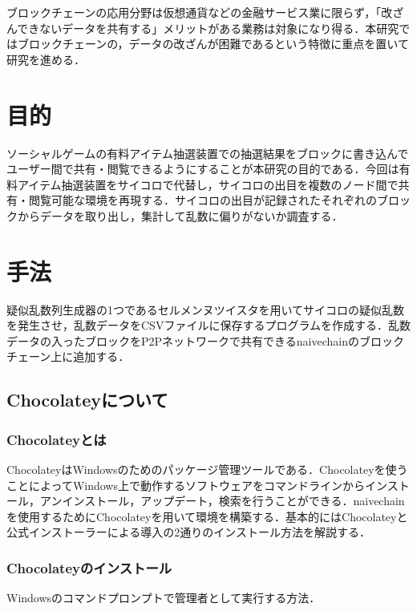 ブロックチェーンの応用分野は仮想通貨などの金融サービス業に限らず，「改ざんできないデータを共有する」メリットがある業務は対象になり得る．本研究ではブロックチェーンの，データの改ざんが困難であるという特徴に重点を置いて研究を進める．

\chapter{目的}

ソーシャルゲームの有料アイテム抽選装置での抽選結果をブロックに書き込んでユーザー間で共有・閲覧できるようにすることが本研究の目的である．今回は有料アイテム抽選装置をサイコロで代替し，サイコロの出目を複数のノード間で共有・閲覧可能な環境を再現する．サイコロの出目が記録されたそれぞれのブロックからデータを取り出し，集計して乱数に偏りがないか調査する．



\chapter{手法}

疑似乱数列生成器の1つであるセルメンヌツイスタを用いてサイコロの疑似乱数を発生させ，乱数データをCSVファイルに保存するプログラムを作成する．乱数データの入ったブロックをP2Pネットワークで共有できるnaivechainのブロックチェーン上に追加する．
\newpage

\section{Chocolateyについて}
\subsection{Chocolateyとは}
ChocolateyはWindowsのためのパッケージ管理ツールである．Chocolateyを使うことによってWindows上で動作するソフトウェアをコマンドラインからインストール，アンインストール，アップデート，検索を行うことができる．naivechainを使用するためにChocolateyを用いて環境を構築する．基本的にはChocolateyと公式インストーラーによる導入の2通りのインストール方法を解説する．


\newpage



\subsection{Chocolateyのインストール}
Windowsのコマンドプロンプトで管理者として実行する方法．

